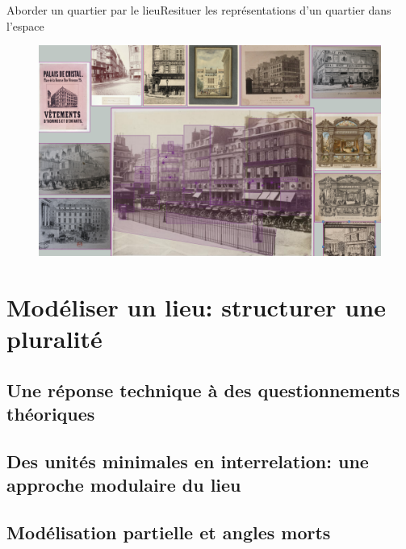 \documentclass[10pt]{beamer}
\begin{document}
\begin{frame}{Aborder un quartier par le lieu}{Resituer les représentations d'un quartier dans l'espace}
	\begin{figure}
		\includegraphics[width=\textwidth]{includes/final_cha.png}
	\end{figure}
\end{frame}

\section{Modéliser un lieu: structurer une pluralité}
\subsection{Une réponse technique à des questionnements théoriques}
\subsection{Des unités minimales en interrelation: une approche modulaire du lieu}
\subsection{Modélisation partielle et angles morts}
\end{document}
